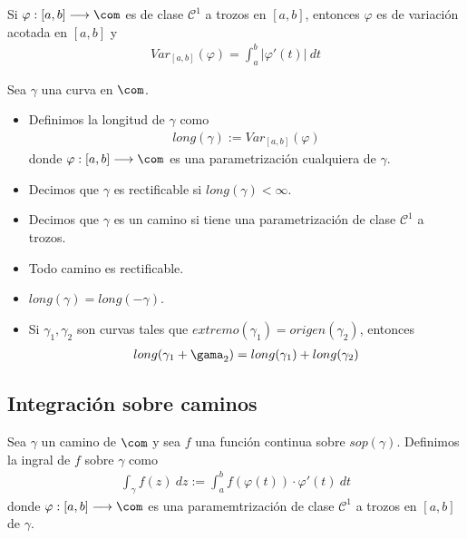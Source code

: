 \begin{prop}
Si $\varphi : [a,b] \longrightarrow \com$ es de clase $\mathscr{C}^1$ a trozos en $[a,b]$, entonces $\varphi$ es de variación acotada en $[a,b]$ y
\begin{align*}
    Var_{[a,b]}(\varphi) = \int_{a}^{b}{\left|\varphi'(t)\right| \ dt}
\end{align*}
\end{prop}

\begin{defi}
Sea $\gamma$ una curva en $\com$.
\begin{itemize}
    \item  Definimos la longitud de $\gamma$ como
    \begin{align*}
        long(\gamma) := Var_{[a,b]}(\varphi)
    \end{align*}
    donde $\varphi : [a,b] \longrightarrow \com$ es una parametrización cualquiera de $\gamma$.
    \item Decimos que $\gamma$ es rectificable si $long(\gamma) < \infty$.
    \item Decimos que $\gamma$ es un camino si tiene una parametrización de clase $\mathscr{C}^1$ a trozos.
\end{itemize}
\end{defi}

\begin{obs}
\begin{itemize}
    \item Todo camino es rectificable.
    \item $long(\gamma) = long(-\gamma)$.
    \item Si $\gamma_1,\gamma_2$ son curvas tales que $extremo(\gamma_1) = origen(\gamma_2)$, entonces
    \begin{align*}
        long(\gamma_1 + \gama_2) = long(\gamma_1) + long(\gamma_2)
    \end{align*}
\end{itemize}
\end{obs}

\subsection{Integración sobre caminos}

\begin{defi}
Sea $\gamma$ un camino de $\com$ y sea $f$ una función continua sobre $sop(\gamma)$. Definimos la ingral de $f$ sobre $\gamma$ como
\begin{align*}
    \int_{\gamma}{f(z) \ dz} := \int_{a}^{b}{f(\varphi(t))\cdot \varphi'(t) \ dt}
\end{align*}
donde $\varphi : [a,b] \longrightarrow \com$ es una paramemtrización de clase $\mathscr{C}^1$ a trozos en $[a,b]$ de $\gamma$.
\end{defi}

